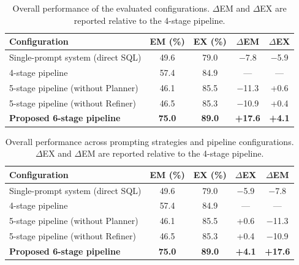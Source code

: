 \documentclass{svproc}
\begin{document}

\begin{table}[t]
\caption{Overall performance of the evaluated configurations. $\Delta$EM and $\Delta$EX are reported relative to the 4-stage pipeline.}
\label{tab:main}
\centering
\scriptsize
\begin{tabular}{@{}lcccc@{}}
\toprule
\textbf{Configuration} & \textbf{EM (\%)} & \textbf{EX (\%)} & \textbf{$\Delta$EM} & \textbf{$\Delta$EX} \\
\midrule
Single-prompt system (direct SQL) & 49.6 & 79.0 & $-$7.8 & $-$5.9 \\
4-stage pipeline & 57.4 & 84.9 & --- & --- \\
5-stage pipeline (without Planner) & 46.1 & 85.5 & $-$11.3 & +0.6 \\
5-stage pipeline (without Refiner) & 46.5 & 85.3 & $-$10.9 & +0.4 \\
\textbf{Proposed 6-stage pipeline} & \textbf{75.0} & \textbf{89.0} & \textbf{+17.6} & \textbf{+4.1} \\
\bottomrule
\end{tabular}
\end{table}


\begin{table}[t]
\caption{Overall performance across prompting strategies and pipeline configurations. $\Delta$EX and $\Delta$EM are reported relative to the 4-stage pipeline.}
\scriptsize
\label{tab:main}
\centering
\begin{tabular}{@{}lcccc@{}}
\toprule
\textbf{Configuration} & \textbf{EM (\%)} & \textbf{EX (\%)} & \textbf{$\Delta$EX} & \textbf{$\Delta$EM} \\
\midrule
Single-prompt system (direct SQL) & 49.6 & 79.0 & $-$5.9 & $-$7.8 \\
4-stage pipeline & 57.4 & 84.9 & --- & --- \\
5-stage pipeline (without Planner) & 46.1 & 85.5 & +0.6 & $-$11.3 \\
5-stage pipeline (without Refiner) & 46.5 & 85.3 & +0.4 & $-$10.9 \\
\textbf{Proposed 6-stage pipeline} & \textbf{75.0} & \textbf{89.0} & \textbf{+4.1} & \textbf{+17.6} \\
\bottomrule
\end{tabular}
\end{table}
\end{document}
